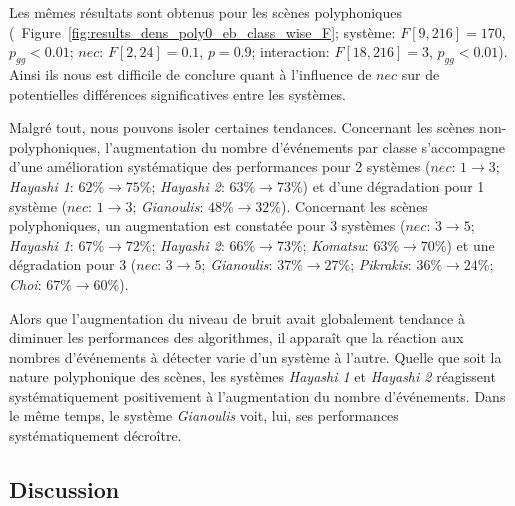 Les mêmes résultats sont obtenus pour les scènes polyphoniques (\cf~Figure~\ref{fig:results_dens_poly0_eb_class_wise_F}; système: $F[9,216]=170$, $p_{gg}<0.01$; $nec$: $F[2,24]=0.1$, $p=0.9$; interaction: $F[18,216]=3$, $p_{gg}<0.01$). Ainsi ils nous est difficile de conclure quant à l'influence de $nec$ sur de potentielles différences significatives entre les systèmes.

Malgré tout, nous pouvons isoler certaines tendances. Concernant les scènes non-polyphoniques, l'augmentation du nombre d'événements par classe s'accompagne d'une amélioration systématique des performances pour 2 systèmes ($nec$: $1\rightarrow 3$; \emph{Hayashi 1}: $62\%\rightarrow 75\%$; \emph{Hayashi 2}: $63\%\rightarrow 73\%$) et d'une dégradation pour 1 système ($nec$: $1\rightarrow 3$; \emph{Gianoulis}: $48\%\rightarrow 32\%$). Concernant les scènes polyphoniques, un augmentation est constatée pour 3 systèmes ($nec$: $3\rightarrow 5$; \emph{Hayashi 1}: $67\%\rightarrow 72\%$; \emph{Hayashi 2}: $66\%\rightarrow 73\%$; \emph{Komatsu}: $63\%\rightarrow 70\%$) et une dégradation pour 3 ($nec$: $3\rightarrow 5$; \emph{Gianoulis}: $37\%\rightarrow 27\%$; \emph{Pikrakis}: $36\%\rightarrow 24\%$; \emph{Choi}: $67\%\rightarrow 60\%$).

Alors que l'augmentation du niveau de bruit avait globalement tendance à diminuer les performances des algorithmes, il apparaît que la réaction aux nombres d'événements à détecter varie d'un système à l'autre. Quelle que soit la nature polyphonique des scènes, les systèmes \emph{Hayashi 1} et \emph{Hayashi 2} réagissent systématiquement positivement à l'augmentation du nombre d'événements. Dans le même temps, le système \emph{Gianoulis} voit, lui, ses performances systématiquement décroître.

\subsection{Discussion}





